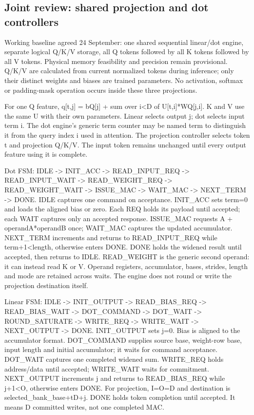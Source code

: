\documentclass[11pt,a4paper]{article}
\begin{document}
\subsection{Joint review: shared projection and dot controllers}

Working baseline agreed 24 September: one shared sequential linear/dot engine, separate logical Q/K/V storage, all Q tokens followed by all K tokens followed by all V tokens. Physical memory feasibility and precision remain provisional. Q/K/V are calculated from current normalized tokens during inference; only their distinct weights and biases are trained parameters. No activation, softmax or padding-mask operation occurs inside these three projections.

For one Q feature, q[t,j] = bQ[j] + sum over i<D of U[t,i]*WQ[j,i]. K and V use the same U with their own parameters. Linear selects output j; dot selects input term i. The dot engine's generic term counter may be named term to distinguish it from the query index i used in attention. The projection controller selects token t and projection Q/K/V. The input token remains unchanged until every output feature using it is complete.

Dot FSM: IDLE -> INIT\_ACC -> READ\_INPUT\_REQ -> READ\_INPUT\_WAIT -> READ\_WEIGHT\_REQ -> READ\_WEIGHT\_WAIT -> ISSUE\_MAC -> WAIT\_MAC -> NEXT\_TERM -> DONE. IDLE captures one command on acceptance. INIT\_ACC sets term=0 and loads the aligned bias or zero. Each REQ holds its payload until accepted; each WAIT captures only an accepted response. ISSUE\_MAC requests A + operandA*operandB once; WAIT\_MAC captures the updated accumulator. NEXT\_TERM increments and returns to READ\_INPUT\_REQ while term+1<length, otherwise enters DONE. DONE holds the widened result until accepted, then returns to IDLE. READ\_WEIGHT is the generic second operand: it can instead read K or V. Operand registers, accumulator, bases, strides, length and mode are retained across waits. The engine does not round or write the projection destination itself.

Linear FSM: IDLE -> INIT\_OUTPUT -> READ\_BIAS\_REQ -> READ\_BIAS\_WAIT -> DOT\_COMMAND -> DOT\_WAIT -> ROUND\_SATURATE -> WRITE\_REQ -> WRITE\_WAIT -> NEXT\_OUTPUT -> DONE. INIT\_OUTPUT sets j=0. Bias is aligned to the accumulator format. DOT\_COMMAND supplies source base, weight-row base, input length and initial accumulator; it waits for command acceptance. DOT\_WAIT captures one completed widened sum. WRITE\_REQ holds address/data until accepted; WRITE\_WAIT waits for commitment. NEXT\_OUTPUT increments j and returns to READ\_BIAS\_REQ while j+1<O, otherwise enters DONE. For projection, I=O=D and destination is selected\_bank\_base+tD+j. DONE holds token completion until accepted. It means D committed writes, not one completed MAC.
\end{document}

